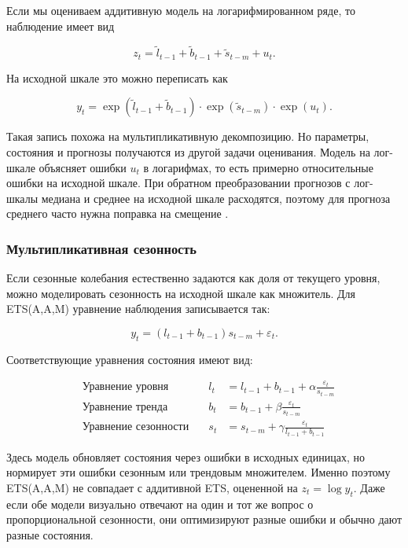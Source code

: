 \documentclass[12pt,fleqn]{article}
\begin{document}
Если мы оцениваем аддитивную модель на логарифмированном ряде, то наблюдение имеет вид

\begin{equation}
  z_t
  =
  \tilde l_{t-1}
  +\tilde b_{t-1}
  +\tilde s_{t-m}
  +u_t.
\end{equation}

На исходной шкале это можно переписать как

\begin{equation}
  y_t
  =
  \exp(\tilde l_{t-1}+\tilde b_{t-1})
  \cdot
  \exp(\tilde s_{t-m})
  \cdot
  \exp(u_t).
\end{equation}

Такая запись похожа на мультипликативную декомпозицию.
Но параметры, состояния и прогнозы получаются из другой задачи оценивания.
Модель на лог-шкале объясняет ошибки \(u_t\) в логарифмах, то есть примерно относительные ошибки на исходной шкале.
При обратном преобразовании прогнозов с лог-шкалы медиана и среднее на исходной шкале расходятся, поэтому для прогноза среднего часто нужна поправка на смещение \cite{fpp3transform}.

\subsubsection{Мультипликативная сезонность}

Если сезонные колебания естественно задаются как доля от текущего уровня, можно моделировать сезонность на исходной шкале как множитель.
Для ETS(A,A,M) уравнение наблюдения записывается так:

\begin{equation}
  y_t
  =
  (l_{t-1}+b_{t-1})s_{t-m}
  +\varepsilon_t.
\end{equation}

Соответствующие уравнения состояния имеют вид:

\begin{equation}
  \begin{array}{llll}
    &\text{Уравнение уровня}\quad & l_t & = l_{t-1} + b_{t-1} + \alpha \frac{\varepsilon_t}{s_{t-m}} \\
    &\text{Уравнение тренда}\quad & b_t & = b_{t-1} + \beta \frac{\varepsilon_t}{s_{t-m}} \\
    &\text{Уравнение сезонности}\quad & s_t & = s_{t-m} + \gamma \frac{\varepsilon_t}{l_{t-1} + b_{t-1}}
  \end{array}
\end{equation}

Здесь модель обновляет состояния через ошибки в исходных единицах, но нормирует эти ошибки сезонным или трендовым множителем.
Именно поэтому ETS(A,A,M) не совпадает с аддитивной ETS, оцененной на \(z_t=\log y_t\).
Даже если обе модели визуально отвечают на один и тот же вопрос о пропорциональной сезонности, они оптимизируют разные ошибки и обычно дают разные состояния.
\end{document}
